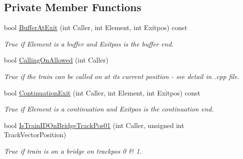 \subsection*{Private Member Functions}
\begin{DoxyCompactItemize}
\item 
\mbox{\label{class_t_train_a2e3e9fd7367a9333b7550b225d328d13}} 
bool \mbox{\hyperlink{class_t_train_a2e3e9fd7367a9333b7550b225d328d13}{Buffer\+At\+Exit}} (int Caller, int Element, int Exitpos) const
\begin{DoxyCompactList}\small\item\em True if Element is a buffer and Exitpos is the buffer end. \end{DoxyCompactList}\item 
\mbox{\label{class_t_train_a4524b72ef62ef2c1375f58fac05929ee}} 
bool \mbox{\hyperlink{class_t_train_a4524b72ef62ef2c1375f58fac05929ee}{Calling\+On\+Allowed}} (int Caller)
\begin{DoxyCompactList}\small\item\em True if the train can be called on at its current position -\/ see detail in .cpp file. \end{DoxyCompactList}\item 
\mbox{\label{class_t_train_a36b7b4901add145605ba1e540801b6cf}} 
bool \mbox{\hyperlink{class_t_train_a36b7b4901add145605ba1e540801b6cf}{Continuation\+Exit}} (int Caller, int Element, int Exitpos) const
\begin{DoxyCompactList}\small\item\em True if Element is a continuation and Exitpos is the continuation end. \end{DoxyCompactList}\item 
\mbox{\label{class_t_train_a0a3a41dac70ba46da2f7f9fd03f2a63f}} 
bool \mbox{\hyperlink{class_t_train_a0a3a41dac70ba46da2f7f9fd03f2a63f}{Is\+Train\+I\+D\+On\+Bridge\+Track\+Pos01}} (int Caller, unsigned int Track\+Vector\+Position)
\begin{DoxyCompactList}\small\item\em True if train is on a bridge on trackpos 0 \& 1. \end{DoxyCompactList}\item 
\mbox{\label{class_t_train_a6cbff3229246b7a156cd64a531aa60a6}} 

\end{DoxyCompactItemize}
